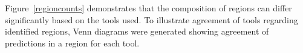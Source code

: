 Figure~\ref{regioncounts} demonstrates that the composition of regions
can differ significantly based on the tools used. To illustrate
agreement of tools regarding identified regions, Venn diagrams
were generated showing agreement of predictions in a region for each tool.

\begin{figure}
  \centering
  
\end{figure}
